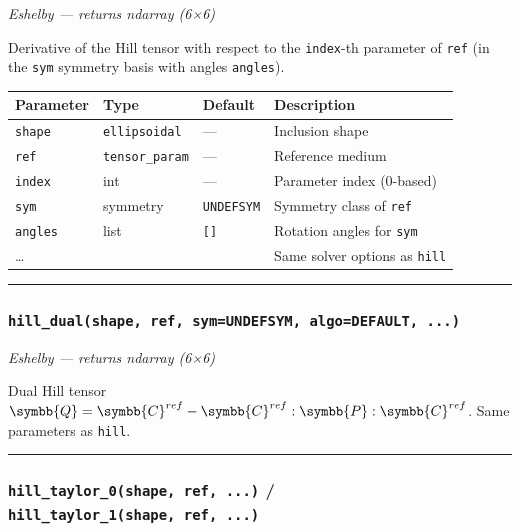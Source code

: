 \documentclass[
  a4paper,
  numbers=noendperiod,
  DIV=12]{scrreprt}
\newcounter{none} %
\newcommand{\uuuu}[1]{{\symbb{{#1}}}}
\begin{document}
\emph{Eshelby --- returns ndarray (6×6)}

Derivative of the Hill tensor with respect to the \texttt{index}-th
parameter of \texttt{ref} (in the \texttt{sym} symmetry basis with
angles \texttt{angles}).

{\def\LTcaptype{none} %
\begin{longtable}[]{@{}llll@{}}
\toprule\noalign{}
Parameter & Type & Default & Description \\
\midrule\noalign{}
\endhead
\bottomrule\noalign{}
\endlastfoot
\texttt{shape} & \texttt{ellipsoidal} & --- & Inclusion shape \\
\texttt{ref} & \texttt{tensor\_param} & --- & Reference medium \\
\texttt{index} & int & --- & Parameter index (0-based) \\
\texttt{sym} & symmetry & \texttt{UNDEFSYM} & Symmetry class of
\texttt{ref} \\
\texttt{angles} & list & \texttt{{[}{]}} & Rotation angles for
\texttt{sym} \\
\ldots{} & & & Same solver options as \texttt{hill} \\
\end{longtable}
}

\begin{center}\rule{0.5\linewidth}{0.5pt}\end{center}

\subsubsection{\texorpdfstring{\texttt{hill\_dual(shape,\ ref,\ sym=UNDEFSYM,\ algo=DEFAULT,\ ...)}}{hill\_dual(shape, ref, sym=UNDEFSYM, algo=DEFAULT, ...)}}\label{api-hill-dual}

\emph{Eshelby --- returns ndarray (6×6)}

Dual Hill tensor
\(\uuuu{Q} = \uuuu{C}^{ref} - \uuuu{C}^{ref}:\uuuu{P}:\uuuu{C}^{ref}\).
Same parameters as \texttt{hill}.

\begin{center}\rule{0.5\linewidth}{0.5pt}\end{center}

\subsubsection{\texorpdfstring{\texttt{hill\_taylor\_0(shape,\ ref,\ ...)}
/
\texttt{hill\_taylor\_1(shape,\ ref,\ ...)}}{hill\_taylor\_0(shape, ref, ...) / hill\_taylor\_1(shape, ref, ...)}}\label{api-hill-taylor}
\end{document}
